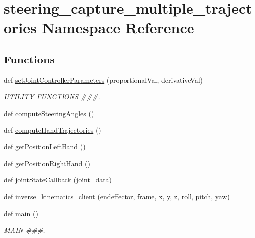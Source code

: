 \hypertarget{namespacesteering__capture__multiple__trajectories}{}\section{steering\+\_\+capture\+\_\+multiple\+\_\+trajectories Namespace Reference}
\label{namespacesteering__capture__multiple__trajectories}
\subsection*{Functions}
\begin{DoxyCompactItemize}
\item 
def \mbox{\hyperlink{namespacesteering__capture__multiple__trajectories_ac83f5e5e6b91803312d66604bbf97255}{set\+Joint\+Controller\+Parameters}} (proportional\+Val, derivative\+Val)
\begin{DoxyCompactList}\small\item\em U\+T\+I\+L\+I\+TY F\+U\+N\+C\+T\+I\+O\+NS \#\#\#. \end{DoxyCompactList}\item 
def \mbox{\hyperlink{namespacesteering__capture__multiple__trajectories_a3927995509cbd9f0c078e0360b4d3fa7}{compute\+Steering\+Angles}} ()
\item 
def \mbox{\hyperlink{namespacesteering__capture__multiple__trajectories_abf792e04838c070143a839f0ed9519af}{compute\+Hand\+Trajectories}} ()
\item 
def \mbox{\hyperlink{namespacesteering__capture__multiple__trajectories_a95175c2c569ebc87d8635cd5ac111f9d}{get\+Position\+Left\+Hand}} ()
\item 
def \mbox{\hyperlink{namespacesteering__capture__multiple__trajectories_aabe5dd4b4636c49de9d19bc3e3af0fc0}{get\+Position\+Right\+Hand}} ()
\item 
def \mbox{\hyperlink{namespacesteering__capture__multiple__trajectories_a86550764a3c3c45dc79a64da0925fbb2}{joint\+State\+Callback}} (joint\+\_\+data)
\item 
def \mbox{\hyperlink{namespacesteering__capture__multiple__trajectories_ad8355642b878dbeb866d47d4a9f453f2}{inverse\+\_\+kinematics\+\_\+client}} (endeffector, frame, x, y, z, roll, pitch, yaw)
\item 
def \mbox{\hyperlink{namespacesteering__capture__multiple__trajectories_ac91eab461598a6eefd844f7f57630083}{main}} ()
\begin{DoxyCompactList}\small\item\em M\+A\+IN \#\#\#. \end{DoxyCompactList}\end{DoxyCompactItemize}
